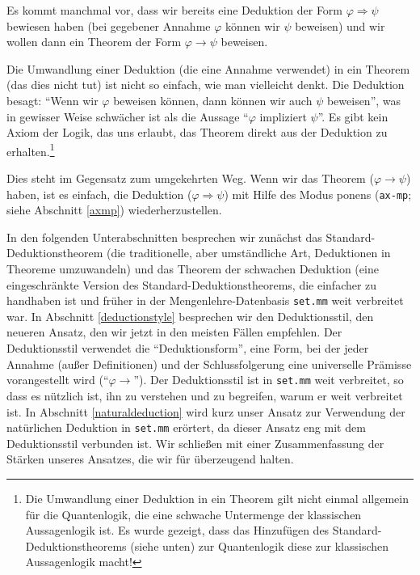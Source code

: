 Es kommt manchmal vor, dass wir bereits eine Deduktion der Form $\varphi \Rightarrow \psi$\index{$\Rightarrow$} bewiesen haben (bei gegebener Annahme $\varphi$ können wir $\psi$ beweisen) und wir wollen dann ein Theorem der Form $\varphi \rightarrow \psi$ beweisen.

Die Umwandlung einer Deduktion (die eine Annahme verwendet) in ein Theorem (das dies nicht tut) ist nicht so einfach, wie man vielleicht denkt. Die Deduktion besagt: "`Wenn wir $\varphi$ beweisen können, dann können wir auch $\psi$ beweisen"', was in gewisser Weise schwächer ist als die Aussage "`$\varphi$ impliziert $\psi$"'. Es gibt kein Axiom der Logik, das uns erlaubt, das Theorem direkt aus der Deduktion zu erhalten.\footnote{Die Umwandlung einer Deduktion in ein Theorem gilt nicht einmal allgemein für die Quantenlogik, die eine schwache Untermenge der klassischen Aussagenlogik ist. Es wurde gezeigt, dass das Hinzufügen des Standard-Deduktionstheorems (siehe unten) zur Quantenlogik diese zur klassischen Aussagenlogik macht!}

Dies steht im Gegensatz zum umgekehrten Weg. Wenn wir das Theorem ($\varphi \rightarrow \psi$) haben, ist es einfach, die Deduktion ($\varphi \Rightarrow \psi$) mit Hilfe des Modus ponens (\texttt{ax-mp}; siehe Abschnitt \ref{axmp}) wiederherzustellen.

In den folgenden Unterabschnitten besprechen wir zunächst das Standard-Deduktionstheorem (die traditionelle, aber umständliche Art, Deduktionen in Theoreme umzuwandeln) und das Theorem der schwachen Deduktion (eine eingeschränkte Version des Standard-Deduktionstheorems, die einfacher zu handhaben ist und früher in der Mengenlehre-Datenbasis \texttt{set.mm} weit verbreitet war. In Abschnitt \ref{deductionstyle} besprechen wir den Deduktionsstil, den neueren Ansatz, den wir jetzt in den meisten Fällen empfehlen. Der Deduktionsstil verwendet die "`Deduktionsform"', eine Form, bei der jeder Annahme (außer Definitionen) und der Schlussfolgerung eine universelle Prämisse vorangestellt wird ("`$\varphi \rightarrow$"'). Der Deduktionsstil ist in \texttt{set.mm} weit verbreitet, so dass es nützlich ist, ihn zu verstehen und zu begreifen, warum er weit verbreitet ist. In Abschnitt \ref{naturaldeduction} wird kurz unser Ansatz zur Verwendung der natürlichen Deduktion in \texttt{set.mm} erörtert, da dieser Ansatz eng mit dem Deduktionsstil verbunden ist. Wir schließen mit einer Zusammenfassung der Stärken unseres Ansatzes, die wir für überzeugend halten.

